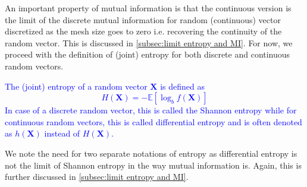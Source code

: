 \documentclass[../Thesis.tex]{subfiles}
\begin{document}
An important property of mutual information is that the continuous version is the limit of the discrete mutual information for random (continuous) vector discretized as the mesh size goes to zero i.e. recovering the continuity of the random vector. This is discussed in \autoref{subsec:limit entropy and MI}. For now, we proceed with the definition of (joint) entropy for both discrete and continuous random vectors.
\textcolor{blue}{
    \begin{definition}[Entropy]\label{def:entropy}
        The (joint) entropy of a random vector $\boldsymbol{X}$ is defined as
        $$H\left(\boldsymbol{X}\right) = - \mathbb{E}\left[\log_b f(\boldsymbol X)\right]$$
        In case of a discrete random vector, this is called the Shannon entropy while for continuous random vectors, this is called differential entropy and is often denoted as $h\left(\boldsymbol X\right)$ instead of $H\left(\boldsymbol X\right)$.
    \end{definition}
}
We note the need for two separate notations of entropy as differential entropy is not the limit of Shannon entropy in the way mutual information is. Again, this is further discussed in \autoref{subsec:limit entropy and MI}.
\end{document}
